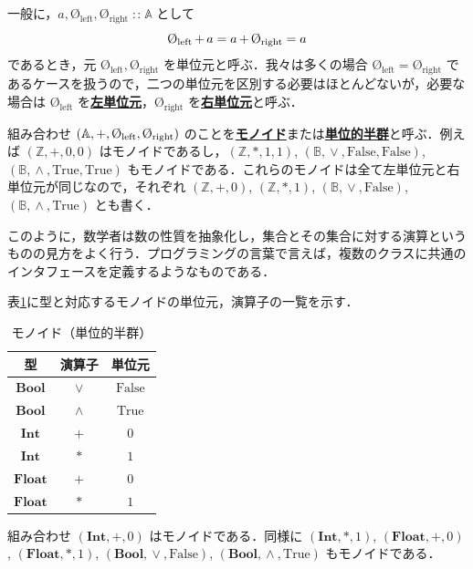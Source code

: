 \documentclass[a5paper,twoside,fleqn,draft]{jsbook}
\newcommand{\keyword}[1]{{\underline{\textbf{#1}}}}
\newcommand{\mSpecialConstant}[1]{\textrm{#1}}
\newcommand{\mFalse}{\mSpecialConstant{False}}
\newcommand{\mTrue}{\mSpecialConstant{True}}
\newcommand{\mZero}{\text{\O}}
\newcommand{\mZeroLeft}{\mZero_\mLeft}
\newcommand{\mZeroRight}{\mZero_\mRight}
\DeclareMathOperator{\mIn}{{:\!:}}
\DeclareMathOperator{\mLogicalAnd}{\wedge}
\DeclareMathOperator{\mLogicalOr}{\vee}
\DeclareMathOperator{\mPlus}{\bf{+}} %
\newcommand{\mSpecialSub}[1]{\text{#1}}
\newcommand{\mLeft}{\mSpecialSub{left}}
\newcommand{\mRight}{\mSpecialSub{right}}
\newcommand{\mSpecialSet}[1]{\mathbb{#1}}
\newcommand{\mASet}{\mSpecialSet{A}}
\newcommand{\mBSet}{\mSpecialSet{B}}
\newcommand{\mZSet}{\mSpecialSet{Z}}
\newcommand{\mType}[1]{\mathbf{#1}} %
\newcommand{\mBoolType}{\mType{Bool}}
\newcommand{\mFloatType}{\mType{Float}}
\newcommand{\mIntType}{\mType{Int}}
\newcommand{\mTupleWith}[1]{\left(#1\right)}
\begin{document}
一般に，$a,\mZeroLeft,\mZeroRight\mIn\mASet$ として
\begin{equation}
  \label{eq:identity}
  \mZeroLeft\mPlus a
  =a\mPlus\mZeroRight
  =a
\end{equation}
であるとき，元 $\mZeroLeft,\mZeroRight$ を単位元と呼ぶ．我々は多くの場合 $\mZeroLeft=\mZeroRight$ であるケースを扱うので，二つの単位元を区別する必要はほとんどないが，必要な場合は $\mZeroLeft$ を\keyword{左単位元}，$\mZeroRight$ を\keyword{右単位元}と呼ぶ．

組み合わせ $\mTupleWith{\mASet,\mPlus,\mZeroLeft,\mZeroRight}$ のことを\keyword{モノイド}または\keyword{単位的半群}と呼ぶ．例えば $\mTupleWith{\mZSet,+,0,0}$ はモノイドであるし，$\mTupleWith{\mZSet,*,1,1}$, $\mTupleWith{\mBSet,\mLogicalOr,\mFalse,\mFalse}$, $\mTupleWith{\mBSet,\mLogicalAnd,\mTrue,\mTrue}$ もモノイドである．これらのモノイドは全て左単位元と右単位元が同じなので，それぞれ $\mTupleWith{\mZSet,+,0}$, $\mTupleWith{\mZSet,*,1}$, $\mTupleWith{\mBSet,\mLogicalOr,\mFalse}$, $\mTupleWith{\mBSet,\mLogicalAnd,\mTrue}$ とも書く．

このように，数学者は数の性質を抽象化し，集合とその集合に対する演算というものの見方をよく行う．プログラミングの言葉で言えば，複数のクラスに共通のインタフェースを定義するようなものである．

表\ref{tab:monoids}に型と対応するモノイドの単位元，演算子の一覧を示す．

\begin{table}
\caption{モノイド（単位的半群）}
\label{tab:monoids}
\begin{center}
\begin{tabular}{||c||c|c||}
\hline 型&演算子&単位元\\\hline\hline
$\mBoolType$ &$\vee$&$\mFalse$\\\hline
$\mBoolType$ &$\wedge$ &$\mTrue$\\\hline\hline
$\mIntType$ &$+$ &$0$\\\hline
$\mIntType$ &$*$ &$1$\\\hline\hline
$\mFloatType$ &$+$ &$0$\\\hline
$\mFloatType$ &$*$ &$1$\\\hline
\end{tabular}
\end{center}
\end{table}

組み合わせ $(\mIntType,+,0)$ はモノイドである．同様に $(\mIntType,*,1)$, $(\mFloatType,+,0)$, $(\mFloatType,*,1)$, $(\mBoolType,\mLogicalOr,\mFalse)$, $(\mBoolType,\mLogicalAnd,\mTrue)$ もモノイドである．
\end{document}
